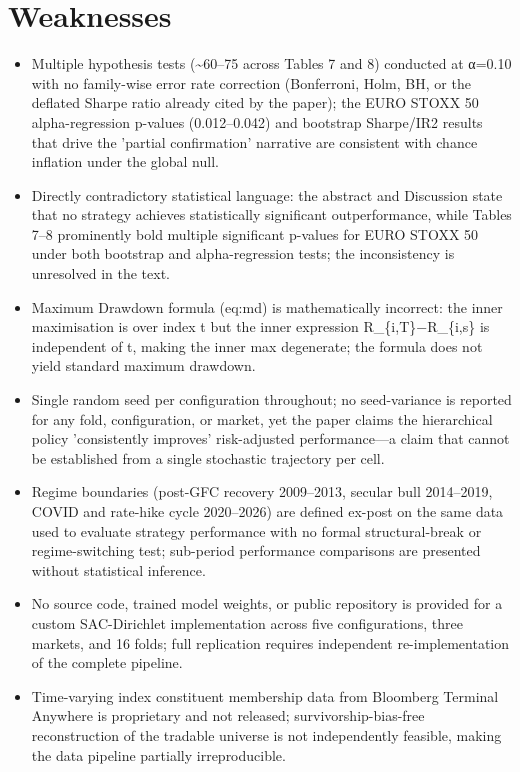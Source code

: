 \documentclass[11pt]{article}
\begin{document}
\section*{Weaknesses}
\begin{itemize}[leftmargin=*]
  \item Multiple hypothesis tests (\~{}60–75 across Tables 7 and 8) conducted at α=0.10 with no family-wise error rate correction (Bonferroni, Holm, BH, or the deflated Sharpe ratio already cited by the paper); the EURO STOXX 50 alpha-regression p-values (0.012–0.042) and bootstrap Sharpe/IR2 results that drive the 'partial confirmation' narrative are consistent with chance inflation under the global null.
  \item Directly contradictory statistical language: the abstract and Discussion state that no strategy achieves statistically significant outperformance, while Tables 7–8 prominently bold multiple significant p-values for EURO STOXX 50 under both bootstrap and alpha-regression tests; the inconsistency is unresolved in the text.
  \item Maximum Drawdown formula (eq:md) is mathematically incorrect: the inner maximisation is over index t but the inner expression R\_\{i,T\}−R\_\{i,s\} is independent of t, making the inner max degenerate; the formula does not yield standard maximum drawdown.
  \item Single random seed per configuration throughout; no seed-variance is reported for any fold, configuration, or market, yet the paper claims the hierarchical policy 'consistently improves' risk-adjusted performance—a claim that cannot be established from a single stochastic trajectory per cell.
  \item Regime boundaries (post-GFC recovery 2009–2013, secular bull 2014–2019, COVID and rate-hike cycle 2020–2026) are defined ex-post on the same data used to evaluate strategy performance with no formal structural-break or regime-switching test; sub-period performance comparisons are presented without statistical inference.
  \item No source code, trained model weights, or public repository is provided for a custom SAC-Dirichlet implementation across five configurations, three markets, and 16 folds; full replication requires independent re-implementation of the complete pipeline.
  \item Time-varying index constituent membership data from Bloomberg Terminal Anywhere is proprietary and not released; survivorship-bias-free reconstruction of the tradable universe is not independently feasible, making the data pipeline partially irreproducible.

\end{itemize}
\end{document}
